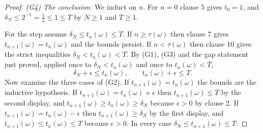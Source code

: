 \begin{proof}
\emph{(G4) The conclusion.} We induct on $n$. For $n=0$ clause 5 gives $t_0=1$,
and $\delta_N\le2^{-1}=\tfrac12\le1\le T$ by $N\ge1$ and $T\ge1$.

For the step assume $\delta_N\le t_n(\omega)\le T$. If $n\ge\tau(\omega)$ then
clause 7 gives $t_{n+1}(\omega)=t_n(\omega)$ and the bounds persist. If
$n<\tau(\omega)$ then clause 10 gives the strict inequalities
$\delta_N<t_n(\omega)<T$. By (G1), (G3) and the gap statement just proved,
applied once to $\delta_N<t_n(\omega)$ and once to $t_n(\omega)<T$,
\[
  \delta_N+\epsilon\le t_n(\omega),\qquad t_n(\omega)+\epsilon\le T .
\]
Now examine the three cases of (G2). If $t_{n+1}(\omega)=t_n(\omega)$ the bounds
are the inductive hypothesis. If $t_{n+1}(\omega)=t_n(\omega)+\epsilon$ then
$t_{n+1}(\omega)\le T$ by the second display, and
$t_{n+1}(\omega)\ge t_n(\omega)\ge\delta_N$ because $\epsilon>0$ by clause 2. If
$t_{n+1}(\omega)=t_n(\omega)-\epsilon$ then $t_{n+1}(\omega)\ge\delta_N$ by the
first display, and $t_{n+1}(\omega)\le t_n(\omega)\le T$ because $\epsilon>0$.
In every case $\delta_N\le t_{n+1}(\omega)\le T$. \end{proof}

